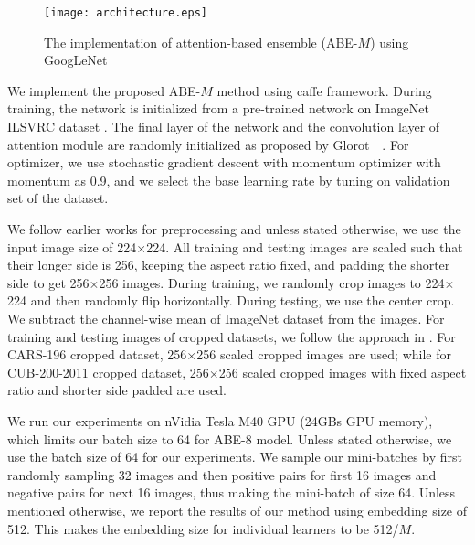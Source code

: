 \documentclass[runningheads]{llncs}
\begin{document}
\begin{figure}[t]
\centering
\texttt{[image: architecture.eps]}
\vspace{-4mm}
\caption{The implementation of attention-based ensemble (ABE-$M$) using GoogLeNet}
\label{fig:architecture}
\vspace{-3mm}
\end{figure}


We implement the proposed ABE-$M$ method using caffe \cite{jia2014caffe} framework.
During training, the network is initialized from a pre-trained network on ImageNet ILSVRC dataset \cite{russakovsky2015imagenet}.
The final layer of the network and the convolution layer of attention module are randomly initialized as proposed by Glorot~\etal~\cite{glorot2010understanding}.
For optimizer, we use stochastic gradient descent with momentum optimizer with momentum as 0.9, and we select the base learning rate by tuning on validation set of the dataset.

We follow earlier works \cite{oh2016deep,wu2017sampling} for preprocessing and unless stated otherwise, we use the input image size of 224$\times$224.
All training and testing images are scaled such that their longer side is 256, keeping the aspect ratio fixed, and padding the shorter side to get 256$\times$256 images. During training, we randomly crop images to 224$\times$224 and then randomly flip horizontally.
During testing, we use the center crop. We subtract the channel-wise mean of ImageNet dataset from the images.
For training and testing images of cropped datasets, we follow the approach in \cite{wu2017sampling}.
For CARS-196 \cite{KrauseStarkDengFei-Fei_3DRR2013} cropped dataset, 256$\times$256 scaled cropped images are used; while for CUB-200-2011 \cite{WahCUB_200_2011} cropped dataset, 256$\times$256 scaled cropped images with fixed aspect ratio and shorter side padded are used.

We run our experiments on nVidia Tesla M40 GPU (24GBs GPU memory), which limits our batch size to 64 for ABE-$8$ model.
Unless stated otherwise, we use the batch size of 64 for our experiments.
We sample our mini-batches by first randomly sampling 32 images and then positive pairs for first 16 images and negative pairs for next 16 images, thus making the mini-batch of size 64.
Unless mentioned otherwise, we report the results of our method using embedding size of 512. This makes the embedding size for individual learners to be 512/$M$.


 
\vspace{-3mm}
\end{document}
